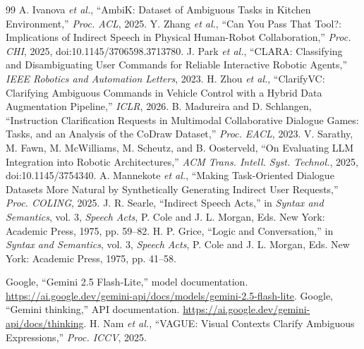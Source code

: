 \documentclass[10pt,conference]{IEEEtran}
\begin{document}
\begin{thebibliography}{99}
 A. Ivanova \emph{et al.}, ``AmbiK: Dataset of Ambiguous Tasks in Kitchen Environment,'' \emph{Proc. ACL}, 2025.
 Y. Zhang \emph{et al.}, ``Can You Pass That Tool?: Implications of Indirect Speech in Physical Human-Robot Collaboration,'' \emph{Proc. CHI}, 2025, doi:10.1145/3706598.3713780.
 J. Park \emph{et al.}, ``CLARA: Classifying and Disambiguating User Commands for Reliable Interactive Robotic Agents,'' \emph{IEEE Robotics and Automation Letters}, 2023.
 H. Zhou \emph{et al.}, ``ClarifyVC: Clarifying Ambiguous Commands in Vehicle Control with a Hybrid Data Augmentation Pipeline,'' \emph{ICLR}, 2026.
 B. Madureira and D. Schlangen, ``Instruction Clarification Requests in Multimodal Collaborative Dialogue Games: Tasks, and an Analysis of the CoDraw Dataset,'' \emph{Proc. EACL}, 2023.
 V. Sarathy, M. Fawn, M. McWilliams, M. Scheutz, and B. Oosterveld, ``On Evaluating LLM Integration into Robotic Architectures,'' \emph{ACM Trans. Intell. Syst. Technol.}, 2025, doi:10.1145/3754340.
 A. Mannekote \emph{et al.}, ``Making Task-Oriented Dialogue Datasets More Natural by Synthetically Generating Indirect User Requests,'' \emph{Proc. COLING}, 2025.
 J. R. Searle, ``Indirect Speech Acts,'' in \emph{Syntax and Semantics}, vol. 3, \emph{Speech Acts}, P. Cole and J. L. Morgan, Eds. New York: Academic Press, 1975, pp. 59--82.
 H. P. Grice, ``Logic and Conversation,'' in \emph{Syntax and Semantics}, vol. 3, \emph{Speech Acts}, P. Cole and J. L. Morgan, Eds. New York: Academic Press, 1975, pp. 41--58.



 Google, ``Gemini 2.5 Flash-Lite,'' model documentation. \url{https://ai.google.dev/gemini-api/docs/models/gemini-2.5-flash-lite}.
 Google, ``Gemini thinking,'' API documentation. \url{https://ai.google.dev/gemini-api/docs/thinking}.
 H. Nam \emph{et al.}, ``VAGUE: Visual Contexts Clarify Ambiguous Expressions,'' \emph{Proc. ICCV}, 2025.
\end{thebibliography}
\end{document}
